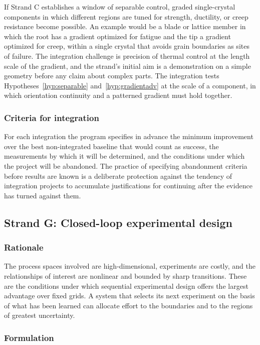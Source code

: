 \documentclass[11pt]{article}
\theoremstyle{definition}
\begin{document}
If Strand C establishes a window of separable control, graded single-crystal components in which different regions are tuned for strength, ductility, or creep resistance become possible. An example would be a blade or lattice member in which the root has a gradient optimized for fatigue and the tip a gradient optimized for creep, within a single crystal that avoids grain boundaries as sites of failure. The integration challenge is precision of thermal control at the length scale of the gradient, and the strand's initial aim is a demonstration on a simple geometry before any claim about complex parts. The integration tests Hypotheses~\ref{hyp:separable} and~\ref{hyp:gradientadv} at the scale of a component, in which orientation continuity and a patterned gradient must hold together.

\subsubsection*{Criteria for integration}

For each integration the program specifies in advance the minimum improvement over the best non-integrated baseline that would count as success, the measurements by which it will be determined, and the conditions under which the project will be abandoned. The practice of specifying abandonment criteria before results are known is a deliberate protection against the tendency of integration projects to accumulate justifications for continuing after the evidence has turned against them.

\subsection{Strand G: Closed-loop experimental design}

\subsubsection*{Rationale}

The process spaces involved are high-dimensional, experiments are costly, and the relationships of interest are nonlinear and bounded by sharp transitions. These are the conditions under which sequential experimental design offers the largest advantage over fixed grids. A system that selects its next experiment on the basis of what has been learned can allocate effort to the boundaries and to the regions of greatest uncertainty.

\subsubsection*{Formulation}
\end{document}
